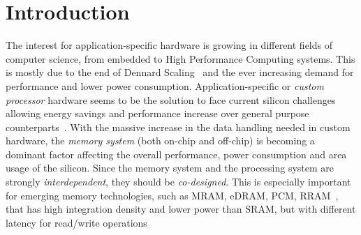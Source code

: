 \section{Introduction}
The interest for application-specific hardware is growing in different fields of computer science, from embedded to High Performance Computing systems. This is mostly due to the end of Dennard Scaling~\cite{esmaeilzadeh2011dark}
and the ever increasing demand for performance and lower power consumption. Application-specific or \textit{custom processor} hardware seems to be the solution to face current silicon challenges allowing energy savings and performance increase over general purpose counterparts~\cite{hameed2010understanding}. With the massive increase in the data handling needed in custom hardware, the \textit{memory system} (both on-chip and off-chip) is becoming a dominant factor affecting the overall performance, power consumption and area usage of the silicon. Since the memory system and the processing system are strongly \textit{interdependent}, they should be \textit{co-designed}. This is especially important for emerging memory technologies, such as MRAM, eDRAM, PCM, RRAM~\cite{mem2016}, that has high integration density and lower power than SRAM, but with different latency for read/write operations

%


